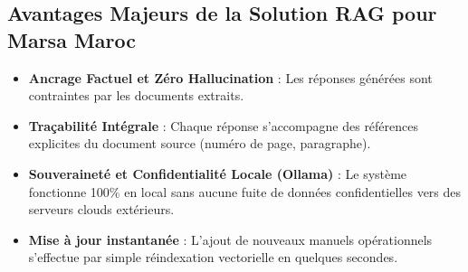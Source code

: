 \documentclass[12pt,a4paper,oneside]{report}
\begin{document}
\begin{table}[H]
\centering
\caption{Comparatif technico-économique entre RAG et Fine-Tuning}
\label{tab:rag_vs_finetuning}
\end{table}


\subsection{Avantages Majeurs de la Solution RAG pour Marsa Maroc}
\begin{itemize}
    \item \textbf{Ancrage Factuel et Zéro Hallucination} : Les réponses générées sont contraintes par les documents extraits.
    \item \textbf{Traçabilité Intégrale} : Chaque réponse s'accompagne des références explicites du document source (numéro de page, paragraphe).
    \item \textbf{Souveraineté et Confidentialité Locale (Ollama)} : Le système fonctionne 100\% en local sans aucune fuite de données confidentielles vers des serveurs clouds extérieurs.
    \item \textbf{Mise à jour instantanée} : L'ajout de nouveaux manuels opérationnels s'effectue par simple réindexation vectorielle en quelques secondes.
\end{itemize}
\end{document}
